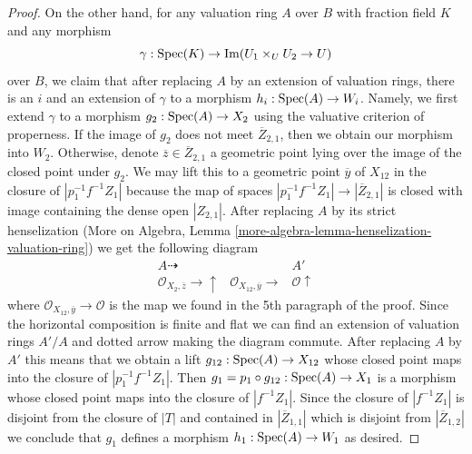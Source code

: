 \begin{proof}
\medskip\noindent
On the other hand, for any valuation ring $A$ over $B$ with
fraction field $K$ and any morphism
$$
\gamma : \operatorname{Spec}(K) \to \operatorname{Im}(U_1 \times_U U_2 \to U)
$$
over $B$, we claim that after replacing $A$ by an extension of valuation
rings, there is an $i$ and an extension of $\gamma$ to a morphism
$h_i : \operatorname{Spec}(A) \to W_i$. Namely, we first extend $\gamma$ to a
morphism $g_2 : \operatorname{Spec}(A) \to X_2$ using the valuative criterion of
properness. If the image of $g_2$ does not meet $\overline{Z}_{2, 1}$,
then we obtain our morphism into $W_2$.
Otherwise, denote $\overline{z} \in \overline{Z}_{2, 1}$ a geometric
point lying over the image of the closed point under $g_2$.
We may lift this to a geometric point $\overline{y}$ of $X_{12}$
in the closure of $|p_1^{-1}f^{-1}Z_1|$ because the map of
spaces $|p_1^{-1}f^{-1}Z_1| \to |\overline{Z}_{2, 1}|$ is closed
with image containing the dense open $|Z_{2, 1}|$. After replacing $A$
by its strict henselization
(More on Algebra, Lemma \ref{more-algebra-lemma-henselization-valuation-ring})
we get the following diagram
$$
\begin{array}{ccc}A \dashrightarrow &  & A' \\ \mathcal{O}_{X_2, \overline{z}} \longrightarrow\uparrow & \mathcal{O}_{X_{12}, \overline{y}} \longrightarrow & \mathcal{O} \uparrow\end{array}
$$
where $\mathcal{O}_{X_{12}, \overline{y}} \to \mathcal{O}$ is the
map we found in the 5th paragraph of the proof.
Since the horizontal composition is finite and flat we can find an
extension of valuation rings $A'/A$ and dotted arrow making the diagram
commute. After replacing $A$ by $A'$ this means that we obtain a lift
$g_{12} : \operatorname{Spec}(A) \to X_{12}$ whose closed point maps into
the closure of $|p_1^{-1}f^{-1}Z_1|$.
Then $g_1 = p_1 \circ g_{12} : \operatorname{Spec}(A) \to X_1$ is a morphism whose
closed point maps into the closure of $|f^{-1}Z_1|$. Since the closure
of $|f^{-1}Z_1|$ is disjoint from the closure of $|T|$ and contained in
$|\overline{Z}_{1, 1}|$ which is disjoint from $|\overline{Z}_{1, 2}|$
we conclude that $g_1$ defines a morphism $h_1 : \operatorname{Spec}(A) \to W_1$
as desired.


\end{proof}
